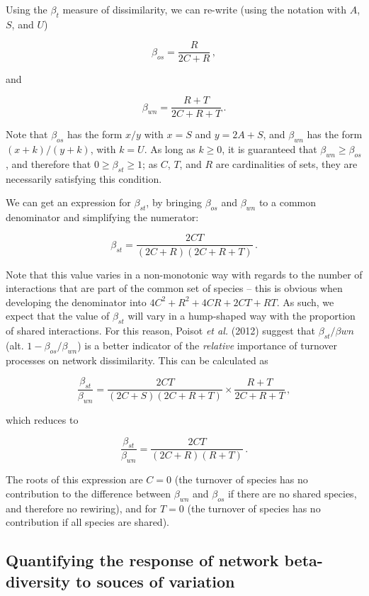 \documentclass[10pt,oneside]{article}
\begin{document}
Using the \(\beta_t\) measure of dissimilarity, we can re-write (using
the notation with \(A\), \(S\), and \(U\))

\[\beta_{os} = \frac{R}{2C+R}\,,\]

and

\[\beta_{wn} = \frac{R+T}{2C+R+T}\,.\]

Note that \(\beta_{os}\) has the form \(x/y\) with \(x = S\) and
\(y = 2A+S\), and \(\beta_{wn}\) has the form \((x+k)/(y+k)\), with
\(k = U\). As long as \(k \ge 0\), it is guaranteed that
\(\beta_{wn} \ge \beta_{os}\), and therefore that
\(0 \ge \beta_{st} \ge 1\); as \(C\), \(T\), and \(R\) are cardinalities
of sets, they are necessarily satisfying this condition.

We can get an expression for \(\beta_{st}\), by bringing \(\beta_{os}\)
and \(\beta_{wn}\) to a common denominator and simplifying the
numerator:

\[\beta_{st} = \frac{2CT}{(2C+R)(2C+R+T)}\,.\]

Note that this value varies in a non-monotonic way with regards to the
number of interactions that are part of the common set of species --
this is obvious when developing the denominator into
\(4C^2 + R^2 + 4CR + 2CT + RT\). As such, we expect that the value of
\(\beta_{st}\) will vary in a hump-shaped way with the proportion of
shared interactions. For this reason, Poisot \emph{et al.} (2012)
suggest that \(\beta_{st}/\beta{wn}\) (alt. \(1-\beta_{os}/\beta_{wn}\))
is a better indicator of the \emph{relative} importance of turnover
processes on network dissimilarity. This can be calculated as

\[\frac{\beta_{st}}{\beta_{wn}} = \frac{2CT}{(2C+S)(2C+R+T)}\times\frac{R+T}{2C+R+T}\,,\]

which reduces to

\[\frac{\beta_{st}}{\beta_{wn}} = \frac{2CT}{(2C+R)(R+T)}\,.\]

The roots of this expression are \(C=0\) (the turnover of species has no
contribution to the difference between \(\beta_{wn}\) and \(\beta_{os}\)
if there are no shared species, and therefore no rewiring), and for
\(T = 0\) (the turnover of species has no contribution if all species
are shared).

\hypertarget{quantifying-the-response-of-network-beta-diversity-to-souces-of-variation}{%
\subsection{Quantifying the response of network beta-diversity to souces
of
variation}\label{quantifying-the-response-of-network-beta-diversity-to-souces-of-variation}}
\end{document}

